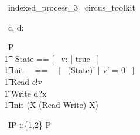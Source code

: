 \begin{zsection}
  \SECTION\ indexed\_process\_3 \parents\ circus\_toolkit
\end{zsection}

\begin{circus}
	\circchannel\ c, d: \nat \\
\end{circus}

\begin{circus}
	\circprocess\ P \circdef \circbegin \\
        \t1 \circstate\ State == [~ v: \nat | true ~] \\
        \t1 Init ~~==~~ [~ (State)' | v' = 0 ~] \\
        \t1 Read \circdef c!v \then \Skip \\
        \t1 Write \circdef d?x \then \Skip \\
        \t1 \circspot \lschexpract Init \rschexpract \circseq (\circmu X \circspot (Read \extchoice Write) \circseq X) \\ 
	\circend
\end{circus}

\begin{circus}
    \circprocess\ IP \circdef i:\{1,2\} \circindex P \\ 
\end{circus}

